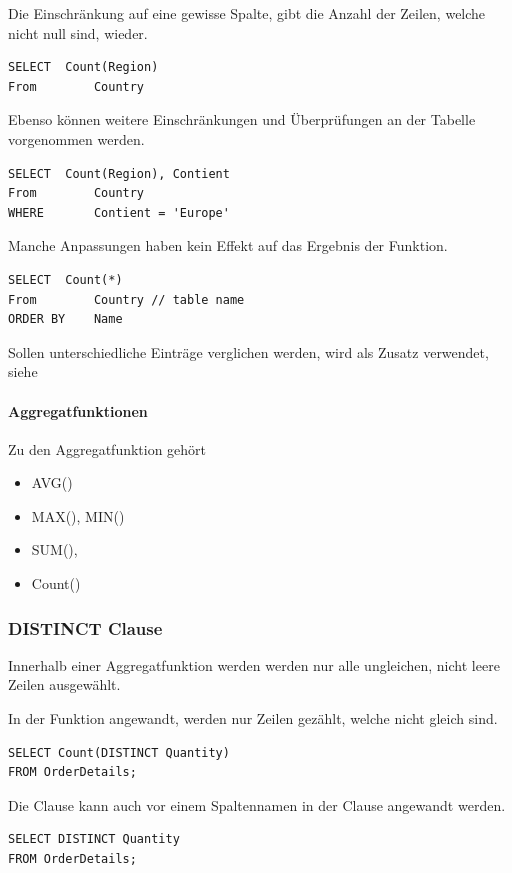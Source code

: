 Die Einschränkung auf eine gewisse Spalte, gibt die Anzahl der Zeilen, welche nicht null sind, wieder.

\begin{lstlisting}[style=SQL]
SELECT 	Count(Region)
From 		Country 
\end{lstlisting}

Ebenso können weitere Einschränkungen und Überprüfungen an der Tabelle vorgenommen werden.

\begin{lstlisting}[style=SQL]
SELECT 	Count(Region), Contient
From 		Country 
WHERE		Contient = 'Europe'
\end{lstlisting}

Manche Anpassungen haben kein Effekt auf das Ergebnis der Funktion.

\begin{lstlisting}[style=SQL]
SELECT 	Count(*)
From 		Country // table name
ORDER BY	Name
\end{lstlisting}

Sollen unterschiedliche Einträge verglichen werden, wird  als Zusatz verwendet, siehe 

\paragraph{Aggregatfunktionen}
Zu den Aggregatfunktion gehört 
\begin{itemize}
\item AVG()
\item MAX(), MIN()
\item SUM(),
\item Count()
\end{itemize}


\subsubsection{DISTINCT Clause}
Innerhalb einer Aggregatfunktion werden werden nur alle ungleichen, nicht leere Zeilen ausgewählt.

In der Funktion  angewandt, werden nur Zeilen gezählt, welche nicht gleich sind.
\begin{lstlisting}[style=SQL]
SELECT Count(DISTINCT Quantity)
FROM OrderDetails;
\end{lstlisting}

Die Clause kann auch vor einem Spaltennamen in der  Clause angewandt werden.

\begin{lstlisting}[style=SQL]
SELECT DISTINCT Quantity
FROM OrderDetails;
\end{lstlisting}

